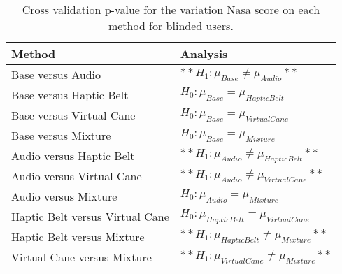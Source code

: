 
\begin{table}[!htb]
\centering
\caption{Cross validation p-value for the variation Nasa score on each method for blinded users.}
\label{tab:lsd_nasa_var}
\begin{tabular}{ll}
\toprule
                         Method &                                      Analysis \\
\midrule
              Base versus Audio &             $**H_{1} : \mu_{Base} \ne \mu_{Audio}**$ \\
        Base versus Haptic Belt &         $H_{0} : \mu_{Base} = \mu_{Haptic Belt}$ \\
       Base versus Virtual Cane &        $H_{0} : \mu_{Base} = \mu_{Virtual Cane}$ \\
            Base versus Mixture &             $H_{0} : \mu_{Base} = \mu_{Mixture}$ \\
       Audio versus Haptic Belt &      $**H_{1} : \mu_{Audio} \ne \mu_{Haptic Belt}**$ \\
      Audio versus Virtual Cane &     $**H_{1} : \mu_{Audio} \ne \mu_{Virtual Cane}**$ \\
           Audio versus Mixture &            $H_{0} : \mu_{Audio} = \mu_{Mixture}$ \\
Haptic Belt versus Virtual Cane & $H_{0} : \mu_{Haptic Belt} = \mu_{Virtual Cane}$ \\
     Haptic Belt versus Mixture &    $**H_{1} : \mu_{Haptic Belt} \ne \mu_{Mixture}**$ \\
    Virtual Cane versus Mixture &   $**H_{1} : \mu_{Virtual Cane} \ne \mu_{Mixture}**$ \\
\bottomrule
\end{tabular}
\end{table}

